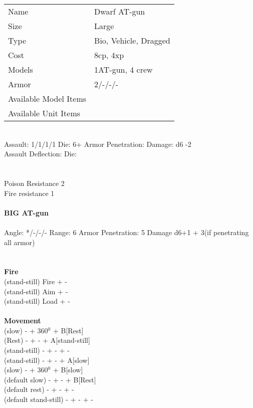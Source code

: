 \begin{tabular}{ll}
  Name & Dwarf AT-gun \\
  Size & Large\\
  Type & Bio, Vehicle, Dragged\\
  Cost & 8cp, 4xp\\
  Models & 1AT-gun, 4 crew\\
  Armor & 2/-/-/-\\
  Available Model Items &  \\
  Available Unit Items &  \\
\end{tabular}

\ \\
Assault: 1/1/1/1 Die: 6+ Armor Penetration:  Damage: d6 -2 \\
Assault Deflection:  Die: \\
\indent  \\
\ \\
Poison Resistance 2 \\ Fire resistance 1
\ \\
\ \\
{\bf BIG AT-gun } \\
\ \\
Angle: */-/-/- Range: 6 Armor Penetration: 5 Damage d6+1 + 3(if penetrating all armor) \\
\indent  \\





\ \\ {\bf Fire } \\
(stand-still) Fire + - \\
(stand-still) Aim + - \\
(stand-still) Load + - \\
\ \\ {\bf Movement } \\
(slow) - + 360$^0$ + B[Rest] \\
(Rest) - + - + A[stand-still] \\
(stand-still) - + - + - \\
(stand-still) - + - + A[slow] \\
(slow) - + 360$^0$ + B[slow] \\
(default slow) - + - + B[Rest] \\
(default rest) - + - + - \\
(default stand-still) - + - + - \\



